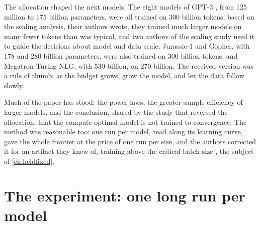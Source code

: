 \begin{refsection}
The allocation shaped the next models. The eight models of GPT-3 \parencite{BrownEtAl2020}, from 125 million to 175 billion parameters, were all trained on 300 billion tokens; based on the scaling analysis, their authors wrote, they trained much larger models on many fewer tokens than was typical, and two authors of the scaling study used it to guide the decisions about model and data scale. Jurassic-1 and Gopher, with 178 and 280 billion parameters, were also trained on 300 billion tokens, and Megatron-Turing NLG, with 530 billion, on 270 billion. The received version was a rule of thumb: as the budget grows, grow the model, and let the data follow slowly.

Much of the paper has stood: the power laws, the greater sample efficiency of larger models, and the conclusion, shared by the study that reversed the allocation, that the compute-optimal model is not trained to convergence. The method was reasonable too: one run per model, read along its learning curve, gave the whole frontier at the price of one run per size, and the authors corrected it for an artifact they knew of, training above the critical batch size \parencite{McCandlishEtAl2018}, the subject of \cref{ch:heldfixed}.

\section{The experiment: one long run per model}\label{sec:protocol:experiment}

\begin{experiment}[Kaplan et al.\ 2020]
\end{experiment}


\end{refsection}
